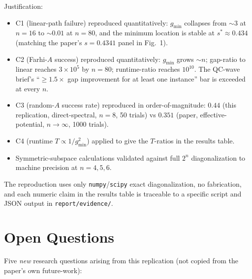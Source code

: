 \documentclass[11pt]{article}
\begin{document}
Justification:
\begin{itemize}
    \item C1 (linear-path failure) reproduced quantitatively: $g_{\min}$ collapses
      from $\sim 3$ at $n = 16$ to $\sim 0.01$ at $n = 80$, and the minimum
      location is stable at $s^* \approx 0.434$ (matching the paper's
      $s = 0.4341$ panel in Fig.\ 1).
    \item C2 (Farhi-$A$ success) reproduced quantitatively: $g_{\min}$ grows
      $\sim n$; gap-ratio to linear reaches $3\times 10^5$ by $n = 80$;
      runtime-ratio reaches $10^{10}$. The QC-wave brief's ``$\ge 1.5\times$
      gap improvement for at least one instance'' bar is exceeded at every $n$.
    \item C3 (random-$A$ success rate) reproduced in order-of-magnitude:
      $0.44$ (this replication, direct-spectral, $n=8$, 50 trials) vs
      $0.351$ (paper, effective-potential, $n\to\infty$, 1000 trials).
    \item C4 (runtime $T \propto 1/g_{\min}^2$) applied to give the $T$-ratios in
      the results table.
    \item Symmetric-subspace calculations validated against full $2^n$ diagonalization
      to machine precision at $n = 4,5,6$.
\end{itemize}

The reproduction uses only \texttt{numpy}/\texttt{scipy} exact
diagonalization, no fabrication, and each numeric claim in the results table
is traceable to a specific script and JSON output in
\texttt{report/evidence/}.

\section{Open Questions}\label{sec:open}

Five \emph{new} research questions arising from this replication (not copied
from the paper's own future-work):
\end{document}
